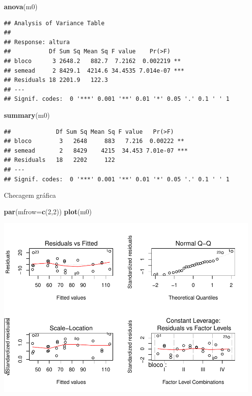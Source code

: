 \documentclass[
]{book}
\newenvironment{Shaded}{\begin{snugshade}}{\end{snugshade}}
\newcommand{\DataTypeTok}[1]{\textcolor[rgb]{0.13,0.29,0.53}{#1}}
\newcommand{\DecValTok}[1]{\textcolor[rgb]{0.00,0.00,0.81}{#1}}
\newcommand{\KeywordTok}[1]{\textcolor[rgb]{0.13,0.29,0.53}{\textbf{#1}}}
\newcommand{\NormalTok}[1]{#1}
\begin{document}
\begin{Shaded}
\begin{Highlighting}[]
\KeywordTok{anova}\NormalTok{(m0)}
\end{Highlighting}
\end{Shaded}

\begin{verbatim}
## Analysis of Variance Table
## 
## Response: altura
##           Df Sum Sq Mean Sq F value    Pr(>F)    
## bloco      3 2648.2   882.7  7.2162  0.002219 ** 
## semead     2 8429.1  4214.6 34.4535 7.014e-07 ***
## Residuals 18 2201.9   122.3                      
## ---
## Signif. codes:  0 '***' 0.001 '**' 0.01 '*' 0.05 '.' 0.1 ' ' 1
\end{verbatim}

\begin{Shaded}
\begin{Highlighting}[]
\KeywordTok{summary}\NormalTok{(m0)}
\end{Highlighting}
\end{Shaded}

\begin{verbatim}
##             Df Sum Sq Mean Sq F value   Pr(>F)    
## bloco        3   2648     883   7.216  0.00222 ** 
## semead       2   8429    4215  34.453 7.01e-07 ***
## Residuals   18   2202     122                     
## ---
## Signif. codes:  0 '***' 0.001 '**' 0.01 '*' 0.05 '.' 0.1 ' ' 1
\end{verbatim}

Checagem gráfica

\begin{Shaded}
\begin{Highlighting}[]
\KeywordTok{par}\NormalTok{(}\DataTypeTok{mfrow=}\KeywordTok{c}\NormalTok{(}\DecValTok{2}\NormalTok{,}\DecValTok{2}\NormalTok{))}
\KeywordTok{plot}\NormalTok{(m0)}
\end{Highlighting}
\end{Shaded}

\includegraphics{TudodoR_files/figure-latex/unnamed-chunk-314-1.pdf}
\end{document}
